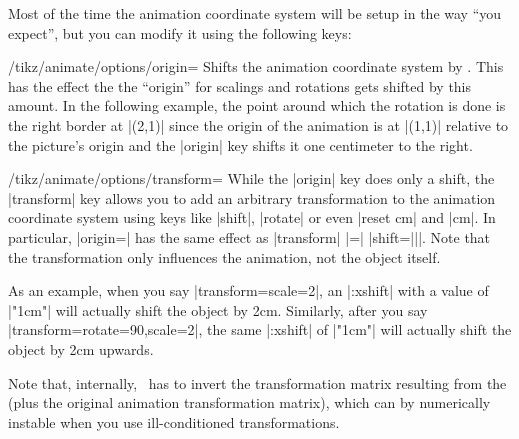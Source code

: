 Most of the time the animation coordinate system will be setup in the
way ``you expect'', but you can modify it using the following keys:

\begin{key}{/tikz/animate/options/origin=}
  Shifts the animation coordinate system by . This
  has the effect the the ``origin'' for scalings and rotations gets
  shifted by this amount. In the following example, the point around
  which the rotation is done is the right border at |(2,1)| since the
  origin of the animation is at |(1,1)| relative to the picture's
  origin and the |origin| key shifts it one centimeter to the right.
\begin{codeexample}[animation list={0.5,1,1.5,2}]
\end{codeexample}
\end{key}

\begin{key}{/tikz/animate/options/transform=}
  While the |origin| key does only a shift, the |transform| key allows
  you to add an arbitrary transformation to the animation coordinate
  system using keys like |shift|, |rotate| or even |reset cm| and
  |cm|. In particular, |origin=| has the same effect as
  |transform| |=| |{shift=||}|. Note that the transformation
  only influences the animation, not the object itself.

  As an example, when you say |transform={scale=2}|, an |:xshift| with
  a value of |"1cm"| will actually shift the object by 2cm. Similarly,
  after you say |transform={rotate=90,scale=2}|, the same |:xshift| of
  |"1cm"| will actually shift the object by 2cm upwards.

  Note that, internally, \tikzname\ has to invert the transformation
  matrix resulting from the  (plus the
  original animation transformation matrix), which can by numerically
  instable when you use ill-conditioned transformations.
\begin{codeexample}[animation list={0.5,1,1.5,2}]
\end{codeexample}
\begin{codeexample}[animation list={0.5,1,1.5,2}]
\end{codeexample}
\end{key}



